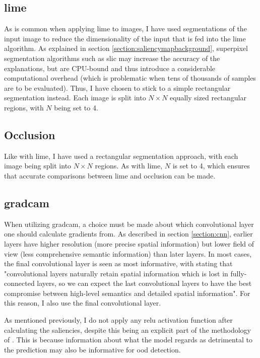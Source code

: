 \documentclass[UKenglish]{uiomasterthesis} %
\theoremstyle{definition}
\begin{document}
\subsection{\ac{lime}}

As is common when applying \ac{lime} to images, I have used segmentations of the input image to reduce the dimensionality of the input that is fed into the \ac{lime} algorithm. As explained in section \ref{section:saliencymapbackground}, superpixel segmentation algorithms such as \ac{slic} may increase the accuracy of the explanations, but are CPU-bound and thus introduce a considerable computational overhead (which is problematic when tens of thousands of samples are to be evaluated). Thus, I have chosen to stick to a simple rectangular segmentation instead. Each image is split into $N \times N$ equally sized rectangular regions, with $N$ being set to 4.

\subsection{Occlusion}

Like with \ac{lime}, I have used a rectangular segmentation approach, with each image being split into $N \times N$ regions. As with \ac{lime}, $N$ is set to 4, which ensures that accurate comparisons between \ac{lime} and occlusion can be made.

\subsection{\ac{gradcam}}

When utilizing \ac{gradcam}, a choice must be made about which convolutional layer one should calculate gradients from. As described in section \ref{section:cnn}, earlier layers have higher resolution (more precise spatial information) but lower field of view (less comprehensive semantic information) than later layers. In most cases, the final convolutional layer is seen as most informative, with \cite{gradcam} stating that "convolutional layers naturally retain spatial information which is lost in fully-connected layers, so we can expect the last convolutional layers to have the best compromise between high-level semantics and detailed spatial information". For this reason, I also use the final convolutional layer.

As mentioned previously, I do not apply any \ac{relu} activation function after calculating the saliencies, despite this being an explicit part of the methodology of \cite{gradcam}. This is because information about what the model regards as detrimental to the prediction may also be informative for \ac{ood} detection.
\end{document}
